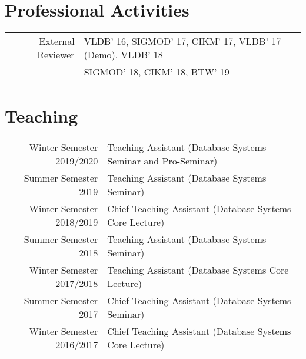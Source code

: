 \documentclass[a4paper,10pt]{article} %
\begin{document}
\section{Professional Activities}
\begin{tabular}{rl}
External Reviewer & VLDB' 16, SIGMOD' 17, CIKM' 17, VLDB' 17 (Demo), VLDB' 18\\
& SIGMOD' 18, CIKM' 18, BTW' 19
\end{tabular}

\section{Teaching}
\begin{tabular}{rl}
Winter Semester 2019/2020 & Teaching Assistant (Database Systems Seminar and Pro-Seminar)\\
Summer Semester 2019 & Teaching Assistant (Database Systems Seminar)\\
Winter Semester 2018/2019 & Chief Teaching Assistant (Database Systems Core Lecture)\\
Summer Semester 2018 & Teaching Assistant (Database Systems Seminar)\\
Winter Semester 2017/2018 & Teaching Assistant (Database Systems Core Lecture)\\
Summer Semester 2017 & Chief Teaching Assistant (Database Systems Seminar)\\
Winter Semester 2016/2017 & Chief Teaching Assistant (Database Systems Core Lecture)
\end{tabular}


\end{document}
